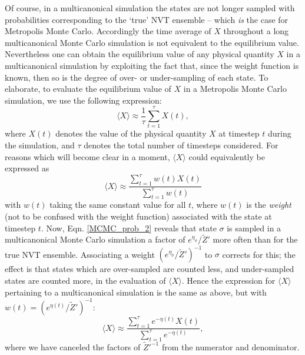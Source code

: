 \documentclass{report}
\begin{document}
Of course, in a multicanonical simulation the states are not longer sampled with probabilities corresponding to the `true' NVT ensemble -- 
which \emph{is} the case for Metropolis Monte Carlo. Accordingly the time average of $X$ throughout a long multicanonical Monte Carlo simulation is 
not equivalent to the equilibrium value. Nevertheless one can obtain the equilibrium value of any physical quantity $X$ in a multicanonical 
simulation by exploiting the fact that, since the weight function is known, then so is the degree of over- or under-sampling of each state. To 
elaborate, to evaluate the equilibrium value of $X$ in a Metropolis Monte Carlo simulation, we use the following expression:
\begin{equation}
\langle X\rangle\approx\frac{1}{\tau}\sum_{t=1}^{\tau}X(t),
\end{equation}
where $X(t)$ denotes the value of the physical quantity $X$ at timestep $t$ during the simulation, and $\tau$ denotes the total number of timesteps
considered. For reasons which will become clear in a moment, $\langle X\rangle$ could equivalently be expressed as
\begin{equation}
\langle X\rangle\approx\frac{\displaystyle\sum_{t=1}^{\tau}w(t)X(t)}{\displaystyle\sum_{t=1}^{\tau}w(t)}
\end{equation}
with $w(t)$ taking the same constant value for all $t$, where $w(t)$ is the \emph{weight} (not to be confused with the weight function) associated 
with the state at timestep $t$.
Now, Eqn. \eqref{MCMC_prob_2} reveals that state $\sigma$ is sampled in a multicanonical Monte Carlo simulation a factor of
$e^{\eta_{\sigma}}/\tilde{Z}'$ more often than for the true NVT ensemble. Associating a weight $(e^{\eta_{\sigma}}/\tilde{Z}')^{-1}$ to $\sigma$ corrects for
this; the effect is that states which are over-sampled are counted less, and under-sampled states are counted more, in the evaluation of $\langle X\rangle$.
Hence the expression for $\langle X\rangle$ pertaining to a multicanonical simulation is the same as above, but with $w(t)=(e^{\eta(t)}/\tilde{Z}')^{-1}$:
\begin{equation}\label{equilX_MCMC}
\langle X\rangle\approx\frac{\displaystyle\sum_{t=1}^{\tau}e^{-\eta(t)}X(t)}{\displaystyle\sum_{t=1}^{\tau}e^{-\eta(t)}},
\end{equation}
where we have canceled the factors of $\tilde{Z}'^{-1}$ from the numerator and denominator.
\end{document}

